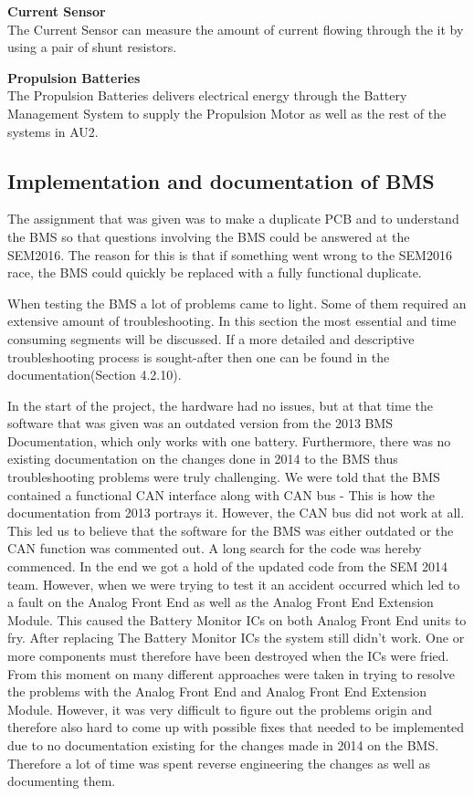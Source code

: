 \textbf{Current Sensor}\\
The Current Sensor can measure the amount of current flowing through the it by using a pair of shunt resistors. 

\textbf{Propulsion Batteries}\\
The Propulsion Batteries delivers electrical energy through the Battery Management System to supply the Propulsion Motor as well as the rest of the systems in AU2.

\subsection{Implementation and documentation of BMS}
The assignment that was given was to make a duplicate PCB and to understand the BMS so that questions involving the BMS could be answered at the SEM2016. The reason for this is that if something went wrong to the SEM2016 race, the BMS could quickly be replaced with a fully functional duplicate.

When testing the BMS a lot of problems came to light. Some of them required an extensive amount of troubleshooting. In this section the most essential and time consuming segments will be discussed. If a more detailed and descriptive troubleshooting process is sought-after then one can be found in the documentation\cite{AU2}(Section 4.2.10).

In the start of the project, the hardware had no issues, but at that time the software that was given was an outdated version from the 2013 BMS Documentation\cite{BMSDocumentation}, which only works with one battery. Furthermore, there was no existing documentation on the changes done in 2014 to the BMS thus troubleshooting problems were truly challenging.
We were told that the BMS contained a functional CAN interface along with CAN bus - This is how the documentation from 2013 portrays it. However, the CAN bus did not work at all. This led us to believe that the software for the BMS was either outdated or the CAN function was commented out. A long search for the code was hereby commenced. In the end we got a hold of the updated code from the SEM 2014 team. However, when we were trying to test it an accident occurred which led to a fault on the Analog Front End as well as the Analog Front End Extension Module. This caused the Battery Monitor ICs on both Analog Front End units to fry.
After replacing The Battery Monitor ICs the system still didn't work. One or more components must therefore have been destroyed when the ICs were fried. From this moment on many different approaches were taken in trying to resolve the problems with the Analog Front End and Analog Front End Extension Module. However, it was very difficult to figure out the problems origin and therefore also hard to come up with possible fixes that needed to be implemented due to no documentation existing for the changes made in 2014 on the BMS. Therefore a lot of time was spent reverse engineering the changes as well as documenting them. 

